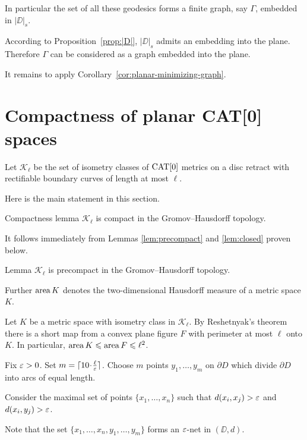 \documentclass[a4paper,10pt]{amsart}
\begin{document}

In particular the set of all these geodesics forms a finite graph, say $\Gamma$,
embedded in $|\DD|_s$. 

According to Proposition~\ref{prop:|D|},
$|\DD|_s$ admits an embedding into the plane.
Therefore $\Gamma$ can be considered as a graph embedded into the plane.

It remains to apply Corollary~\ref{cor:planar-minimizing-graph}.
\qeds

\section{Compactness of planar CAT[0] spaces}

Let $\mathcal{K}_\ell$ be the set of isometry classes of $\mathop{\rm CAT}\nolimits[0]$ metrics on a disc retract with rectifiable
boundary curves of length at most $\ell$.


Here is the main statement in this section.

\begin{thm}{Compactness lemma}\label{lem:compact}
$\mathcal{K}_\ell$ is compact in the Gromov--Hausdorff topology.
\end{thm}

It follows immediately from Lemmas \ref{lem:precompact} and \ref{lem:closed} proven below.

\begin{thm}{Lemma}\label{lem:precompact}
$\mathcal{K}_\ell$ is precompact in the Gromov--Hausdorff topology.
\end{thm}

Further $\mathop{\rm area}\nolimits K$ denotes the two-dimensional Hausdorff measure of a metric space $K$. 

Let $K$ be a metric space with isometry class in $\mathcal {K}_\ell$.
By Reshetnyak's theorem there is a short map from a convex plane figure $F$ with perimeter at most $\ell$ onto $K$.
In particular, $\mathop{\rm area}\nolimits K \leqslant \mathop{\rm area}\nolimits F 
\leqslant \ell^2$.

Fix $\varepsilon>0$. 
Set $m=\lceil 10\cdot\tfrac\ell\eps\rceil$.
Choose $m$ points $y_1,\dots,y_m$ on $\partial D$
which divide $\partial D$ into arcs of equal length.

Consider the maximal set of points $\{x_1,\dots,x_n\}$ such that $d(x_i,x_j)>\varepsilon$ and $d(x_i,y_j)>\varepsilon$.

Note that the set $\{x_1,\dots,x_n,y_1,\dots,y_m\}$
forms an $\varepsilon$-net in $(\DD,d)$.
\end{document}
